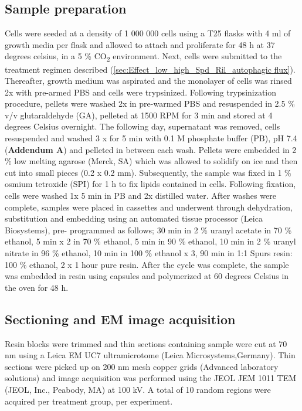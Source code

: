 \subsection{Sample preparation}
Cells were seeded at a density of 1 000 000 cells using a T25 flasks with 4 ml of growth media per flask and allowed to attach and proliferate for 48 h at 37 degrees  celsius, in a 5 \% CO\textsubscript{2} environment. Next, cells were submitted to the treatment regimen described (\cref{sec:Effect_low_high_Spd_Ril_autophagic flux}). Thereafter, growth medium was aspirated and the monolayer of cells was rinsed 2x with pre-armed PBS and cells were trypsinized. Following trypsinization procedure, pellets were washed 2x in pre-warmed PBS and resuspended in 2.5 \% v/v glutaraldehyde (GA), pelleted at 1500 RPM for 3 min and stored at 4 degrees Celsius overnight. The following day, supernatant was removed, cells resuspended and washed 3 x for 5 min with 0.1 M phosphate buffer (PB), pH 7.4 (\textbf{Addendum A}) and pelleted in between each wash. Pellets were embedded in 2 \% low melting agarose (Merck, SA) which was allowed to solidify on ice and then cut into small pieces (0.2 x 0.2 mm). Subsequently, the sample was fixed in 1 \% osmium tetroxide (SPI) for 1 h to fix lipids contained in cells. Following fixation, cells were washed 1x 5 min in PB and 2x distilled water. After washes were complete, samples were placed in cassettes and underwent through dehydration, substitution and embedding using an automated tissue processor (Leica Biosystems), pre- programmed as follows; 30 min in 2 \% uranyl acetate in 70 \% ethanol, 5 min x 2 in 70 \% ethanol, 5 min in 90 \% ethanol, 10 min in 2 \% uranyl nitrate in 96 \% ethanol, 10 min in 100 \% ethanol x 3, 90 min in 1:1 Spurs resin: 100 \% ethanol, 2 x 1 hour pure resin. After the cycle was complete, the sample was embedded in resin using capsules and polymerized at 60 degrees Celsius in the oven for 48 h.

\subsection{Sectioning and EM image acquisition}
Resin blocks were trimmed and thin sections containing sample were cut at 70 nm using a Leica EM UC7 ultramicrotome (Leica Microsystems,Germany). Thin sections were picked up on 200 nm mesh copper grids (Advanced laboratory solutions) and image acquisition was performed using the JEOL JEM 1011 TEM (JEOL, Inc., Peabody, MA) at 100 kV. A total of 10 random regions were acquired per treatment group, per experiment.  

